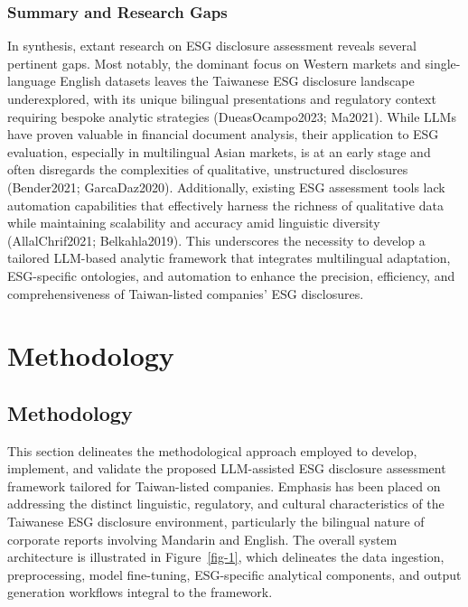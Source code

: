\documentclass[
  12pt,
]{article}
\begin{document}
\subsubsection{Summary and Research
Gaps}\label{summary-and-research-gaps}

In synthesis, extant research on ESG disclosure assessment reveals
several pertinent gaps. Most notably, the dominant focus on Western
markets and single-language English datasets leaves the Taiwanese ESG
disclosure landscape underexplored, with its unique bilingual
presentations and regulatory context requiring bespoke analytic
strategies (DueasOcampo2023; Ma2021). While LLMs have proven valuable in
financial document analysis, their application to ESG evaluation,
especially in multilingual Asian markets, is at an early stage and often
disregards the complexities of qualitative, unstructured disclosures
(Bender2021; GarcaDaz2020). Additionally, existing ESG assessment tools
lack automation capabilities that effectively harness the richness of
qualitative data while maintaining scalability and accuracy amid
linguistic diversity (AllalChrif2021; Belkahla2019). This underscores
the necessity to develop a tailored LLM-based analytic framework that
integrates multilingual adaptation, ESG-specific ontologies, and
automation to enhance the precision, efficiency, and comprehensiveness
of Taiwan-listed companies' ESG disclosures.

\section{Methodology}\label{methodology}

\subsection{Methodology}\label{methodology-1}

This section delineates the methodological approach employed to develop,
implement, and validate the proposed LLM-assisted ESG disclosure
assessment framework tailored for Taiwan-listed companies. Emphasis has
been placed on addressing the distinct linguistic, regulatory, and
cultural characteristics of the Taiwanese ESG disclosure environment,
particularly the bilingual nature of corporate reports involving
Mandarin and English. The overall system architecture is illustrated in
Figure~\ref{fig-1}, which delineates the data ingestion, preprocessing,
model fine-tuning, ESG-specific analytical components, and output
generation workflows integral to the framework.
\end{document}
